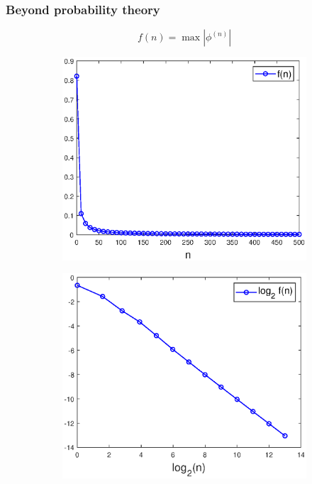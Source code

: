 \documentclass{beamer}
\theoremstyle{definition}
\begin{document}
\begin{frame}
\frametitle{Beyond probability theory}

\begin{equation*}
f(n) = \max|\phi^{(n)}|
\end{equation*}



\begin{figure}[!htb]
	\begin{subfigure}{0.49\textwidth}
		\centering
		\includegraphics[width=\textwidth]{decay_11.eps}
	\end{subfigure}
	\begin{subfigure}{0.49\textwidth}
		\centering
		\includegraphics[width=\textwidth]{decay_1.eps}
	\end{subfigure}
\end{figure}

\end{frame}
\end{document}
